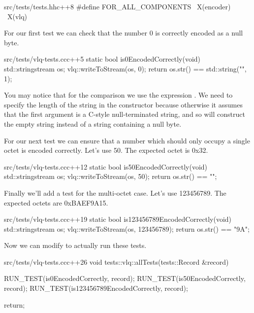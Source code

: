 \begin{file}{src/tests/tests.hh}{c++}{8}
#define FOR_ALL_COMPONENTS \
    X(encoder)             \
    X(vlq)
\end{file}

For our first test we can check that the number 0 is correctly encoded as a null byte.

\begin{file}{src/tests/vlq-tests.cc}{c++}{5}
static bool is0EncodedCorrectly(void)
{
    std::stringstream os;
    vlq::writeToStream(os, 0);
    return os.str() == std::string("\0", 1);
}
\end{file}

You may notice that for the comparison we use the expression . We need to specify the length of the string in the constructor because otherwise it assumes that the first argument is a C-style null-terminated string, and so will construct the empty string instead of a string containing a null byte.

For our next test we can ensure that a number which should only occupy a single octet is encoded correctly. Let's use 50. The expected octet is 0x32.

\begin{file}{src/tests/vlq-tests.cc}{c++}{12}
static bool is50EncodedCorrectly(void)
{
    std::stringstream os;
    vlq::writeToStream(os, 50);
    return os.str() == "";
}
\end{file}

Finally we'll add a test for the multi-octet case. Let's use 123456789. The expected octets are 0xBAEF9A15.

\begin{file}{src/tests/vlq-tests.cc}{c++}{19}
static bool is123456789EncodedCorrectly(void)
{
    std::stringstream os;
    vlq::writeToStream(os, 123456789);
    return os.str() == "\xBA\xEF\x9A";
}
\end{file}

Now we can modify  to actually run these tests.

\begin{file}{src/tests/vlq-tests.cc}{c++}{26}
void tests::vlq::allTests(tests::Record &record)
{

    RUN_TEST(is0EncodedCorrectly, record);
    RUN_TEST(is50EncodedCorrectly, record);
    RUN_TEST(is123456789EncodedCorrectly, record);

    return;
}
\end{file}

